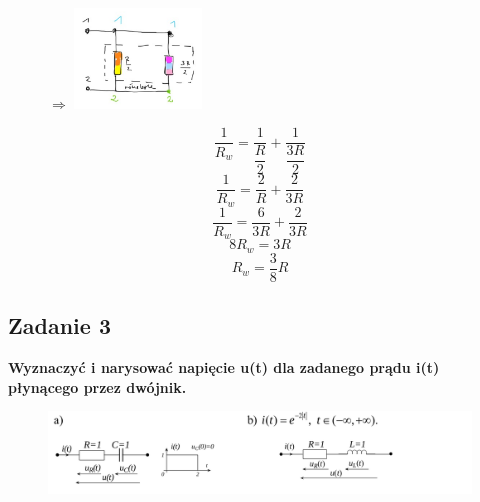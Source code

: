 \documentclass[12pt, a4paper]{article}
\begin{document}
\begin{enumerate}[label=\alph*)]
\begin{figure}[H]
          $ \Rightarrow $
          \includegraphics[width = 0.3\textwidth]{./images/Lista_1/Zadanie2b_5.png}
        \end{figure}
        $$
          \frac{1}{R_w} = \frac{1}{\dfrac{R}{2}} + \frac{1}{\dfrac{3R}{2}}
        $$
        $$
          \frac{1}{R_w} = \frac{2}{R} + \frac{2}{3R}
        $$
        $$
          \frac{1}{R_w} = \frac{6}{3R} + \frac{2}{3R}
        $$
        $$
          8R_w = 3R
        $$
        $$
          R_w = \frac{3}{8}R
        $$
\end{enumerate}
\subsection{Zadanie 3}
\textbf{Wyznaczyć i narysować napięcie u(t) dla zadanego prądu i(t) płynącego przez dwójnik.}
\begin{figure}[H]
  \centering
  \includegraphics[width = \textwidth]{./images/Lista_1/Zadanie_3.png}
\end{figure}
\end{document}
